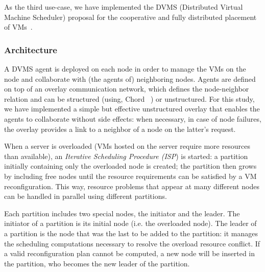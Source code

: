As the third use-case, we have implemented the DVMS (Distributed
Virtual Machine Scheduler) proposal for the cooperative and fully
distributed placement of VMs~\cite{quesnel:cpe2012}.
%
%


\subsubsection{Architecture}

A DVMS agent is deployed on each node in order to manage the VMs on
the node and collaborate with (the agents of) neighboring nodes.
Agents are defined on top of an overlay communication network, which
defines the node-neighbor relation and can be structured (using, \eg
Chord ~\cite{stoica:2001:sigcomm01}) or unstructured. For this study,
we have implemented a simple but effective unstructured overlay that
enables the agents to collaborate without side effects: when
necessary, \eg in case of node failures, the overlay provides a link
to a neighbor of a node on the latter's request.  

When a server is overloaded (\ie VMs hosted on the server require more
resources than available), an \emph{Iterative Scheduling Procedure
  (ISP}) is started: a partition initially containing only the
overloaded node is created; the partition then grows by including free
nodes until the resource requirements can be satisfied by a VM
reconfiguration. This way, resource problems that appear at many
different nodes can be handled in parallel using different
partitions. 

Each partition includes two special nodes, the initiator and the
leader.  The initiator of a partition is its initial node (i.e. the
overloaded node).  The leader of a partition is the node that was the
last to be added to the partition: it manages the scheduling
computations necessary to resolve the overload resource conflict. If a
valid reconfiguration plan cannot be computed, a new node will be
inserted in the partition, who becomes the new leader of the
partition.



